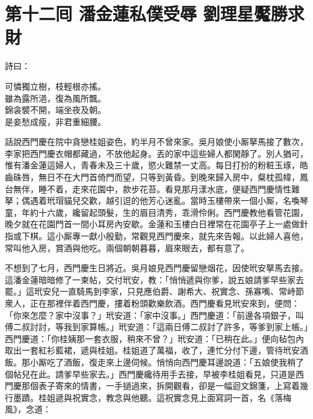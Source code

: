 
\chapter*{第十二囘 潘金蓮私僕受辱 劉理星魘勝求財}


詩曰：

\begin{myquote}
可憐獨立樹，枝輕根亦搖。\\雖為露所浥，復為風所飄。\\錦衾襞不開，端坐夜及朝。\\是妾愁成瘦，非君重細腰。
\end{myquote}

話說西門慶在院中貪戀桂姐姿色，{}約半月不曾來家。吳月娘使小厮拏馬接了數次，李家把西門慶衣帽都藏過，不放他起身。丟的家中這些婦人都閑靜了。別人猶可，惟有潘金蓮這婦人，青春未及三十歲，慾火難禁一丈高。每日打扮的粉粧玉琢，皓齒硃唇，無日不在大門首倚門而望，只等到黃昏。到晚來歸入房中，粲枕孤幃，鳳台無伴，睡不着，走來花園中，款步花苔。看見那月漾水底，便疑西門慶情性難拏；偶遇着玳瑁貓兒交歡，越引逗的他芳心迷亂。當時玉樓帶來一個小厮，名喚琴童，年約十六歲，纔留起頭髮，生的眉目清秀，乖滑伶俐。{}西門慶教他看管花園，晚夕就在花園門首一間小耳房內安歇。金蓮和玉樓白日裡常在花園亭子上一處做針指或下棋。這小厮專一獻小殷勤，{}常觀見西門慶來，就先來告報。以此婦人喜他，常叫他入房，賞酒與他吃。兩個朝朝暮暮，眉來眼去，都有意了。

不想到了七月，西門慶生日將近。吳月娘見西門慶留戀烟花，因使玳安拏馬去接。這潘金蓮暗暗修了一柬帖，交付玳安，教：「悄悄遞與你爹，說五娘請爹早些家去罷。」這玳安兒一直騎馬到李家，只見應伯爵、謝希大、祝實念、孫寡嘴、常峙節衆人，正在那裡伴着西門慶，摟着粉頭歡樂飲酒。西門慶看見玳安來到，便問：「你來怎麼？家中沒事？」玳安道：「家中沒事。」西門慶道：「前邊各項銀子，叫傅二叔討討，等我到家算帳。」{}玳安道：「這兩日傅二叔討了許多，等爹到家上帳。」{}西門慶道：「你桂姨那一套衣服，{}稍來不曾？」玳安道：「已稍在此。」便向毡包內取出一套紅衫藍裙，遞與桂姐。桂姐道了萬福，收了，連忙分付下邊，管待玳安酒飯。那小厮吃了酒飯，復走來上邊伺候。悄悄向西門慶耳邊說道：「五娘使我稍了個帖兒在此。請爹早些家去。」西門慶纔待用手去接，早被李桂姐看見，只道是西門慶那個表子寄來的情書，一手撾過來，拆開觀看，卻是一幅迴文錦箋，上寫着幾行墨蹟。桂姐遞與祝實念，教念與他聽。這祝實念見上面寫詞一首，名《落梅風》，念道：

